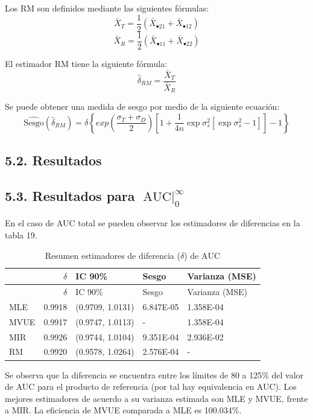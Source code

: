 \documentclass[]{article}
\begin{document}
Los RM son definidos mediante las siguientes fórmulas:
\[\bar{X}_{T} = \frac{1}{2}\left(\bar{X}_{\bullet 21}+\bar{X}_{\bullet 12}\right)\]
\[\bar{X}_{R} = \frac{1}{2}\left(\bar{X}_{\bullet 11}+\bar{X}_{\bullet 22}\right)\]

El estimador RM tiene la siguiente fórmula:\\
\[\hat{\delta}_{RM} = \frac{\bar{X}_{T}}{\bar{X}_{R}}\]

Se puede obtener una medida de sesgo por medio de la siguiente ecuación:
\[\hat{\textrm{Sesgo}}(\hat{\delta}_{RM})=\delta\left\{exp{\left(\frac{\sigma_{T}+\sigma_{D}}{2}\right)}\left[1+\frac{1}{4n}\exp{\sigma_{s}^{2}}\left[\exp{\sigma_{s}^{2}}-1\right]\right]-1\right\}\]

\subsection{5.2. Resultados}\label{resultados}

\subsection{\texorpdfstring{5.3. Resultados para
\(\textrm{AUC}\mid_{0}^{\infty}\)}{5.3. Resultados para \textbackslash{}textrm\{AUC\}\textbackslash{}mid\_\{0\}\^{}\{\textbackslash{}infty\}}}\label{resultados-para-textrmaucmid_0infty}

En el caso de AUC total se pueden observar los estimadores de
diferencias en la tabla 19.

\begin{longtable}[]{@{}lrlll@{}}
\caption{Resumen estimadores de diferencia (\(\delta\)) de
\(\textrm{AUC}\)}\tabularnewline
\toprule
& \(\delta\) & IC 90\% & Sesgo & Varianza (MSE)\tabularnewline
\midrule
\endfirsthead
\toprule
& \(\delta\) & IC 90\% & Sesgo & Varianza (MSE)\tabularnewline
\midrule
\endhead
MLE & 0.9918 & (0.9709, 1.0131) & 6.847E-05 & 1.358E-04\tabularnewline
MVUE & 0.9917 & (0.9747, 1.0113) & - & 1.358E-04\tabularnewline
MIR & 0.9926 & (0.9744, 1.0104) & 9.351E-04 & 2.936E-02\tabularnewline
RM & 0.9920 & (0.9578, 1.0264) & 2.576E-04 & -\tabularnewline
\bottomrule
\end{longtable}

Se observa que la diferencia se encuentra entre los límites de 80 a
125\% del valor de AUC para el producto de referencia (por tal hay
equivalencia en AUC). Los mejores estimadores de acuerdo a su varianza
estimada son MLE y MVUE, frente a MIR. La eficiencia de MVUE comparada a
MLE es 100.034\%.
\end{document}
